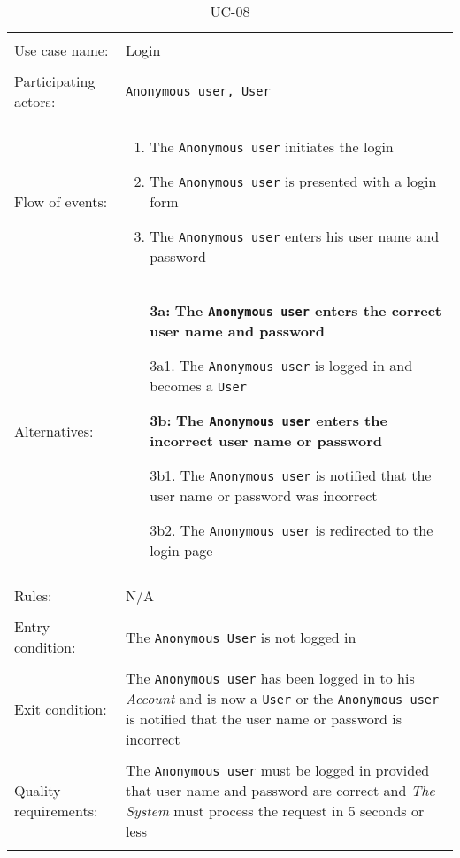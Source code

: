 \noindent
\begin{table}[h!]
\caption{UC-08}
\label{UC-08}
\centering
\begin{tabular}{ l p{8cm} }
\hline             
\\    
Use case name:  & Login   \\   \hline \\            
Participating actors:  & \texttt{Anonymous user, User} \\   \hline \\   
Flow of events: & \begin{enumerate}
\item{The \texttt{Anonymous user} initiates the login}
\item{The \texttt{Anonymous user} is presented with a login form}
\item{The \texttt{Anonymous user} enters his user name and password}
\end{enumerate} \\
Alternatives: & \begin{itemize}
\item[\textbf{3a:}] \textbf{The \texttt{Anonymous user} enters the correct user name and password}
\item[]  3a1. The \texttt{Anonymous user} is logged in and becomes a \texttt{User}
\item[\textbf{3b:}] \textbf{The \texttt{Anonymous user} enters the incorrect user name or password}
\item[]  3b1. The \texttt{Anonymous user} is notified that the user name or password was incorrect
\item[]  3b2. The \texttt{Anonymous user} is redirected to the login page
\end{itemize} \\ 
\hline \\
Rules: & N/A \\ \hline \\
Entry condition: & The \texttt{Anonymous User} is not logged in \\ \hline \\
Exit condition: & The \texttt{Anonymous user} has been logged in to his \textit{Account} and is now a \texttt{User} or the \texttt{Anonymous user} is notified that the user name or password is incorrect \\ \hline \\
Quality requirements: & The \texttt{Anonymous user} must be logged in provided that user name and password are correct and \textit{The System} must process the request in 5 seconds or less \\ \hline \\            
\end{tabular} \\
\end{table}

